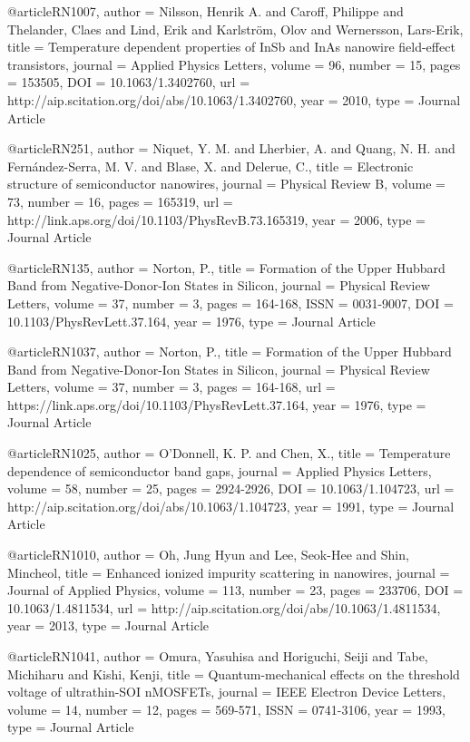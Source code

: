 @article{RN1007,
   author = {Nilsson, Henrik A. and Caroff, Philippe and Thelander, Claes and Lind, Erik and Karlström, Olov and Wernersson, Lars-Erik},
   title = {Temperature dependent properties of InSb and InAs nanowire field-effect transistors},
   journal = {Applied Physics Letters},
   volume = {96},
   number = {15},
   pages = {153505},
   DOI = {10.1063/1.3402760},
   url = {http://aip.scitation.org/doi/abs/10.1063/1.3402760},
   year = {2010},
   type = {Journal Article}
}

@article{RN251,
   author = {Niquet, Y. M. and Lherbier, A. and Quang, N. H. and Fernández-Serra, M. V. and Blase, X. and Delerue, C.},
   title = {Electronic structure of semiconductor nanowires},
   journal = {Physical Review B},
   volume = {73},
   number = {16},
   pages = {165319},
   url = {http://link.aps.org/doi/10.1103/PhysRevB.73.165319},
   year = {2006},
   type = {Journal Article}
}

@article{RN135,
   author = {Norton, P.},
   title = {Formation of the Upper Hubbard Band from Negative-Donor-Ion States in Silicon},
   journal = {Physical Review Letters},
   volume = {37},
   number = {3},
   pages = {164-168},
   ISSN = {0031-9007},
   DOI = {10.1103/PhysRevLett.37.164},
   year = {1976},
   type = {Journal Article}
}

@article{RN1037,
   author = {Norton, P.},
   title = {Formation of the Upper Hubbard Band from Negative-Donor-Ion States in Silicon},
   journal = {Physical Review Letters},
   volume = {37},
   number = {3},
   pages = {164-168},
   url = {https://link.aps.org/doi/10.1103/PhysRevLett.37.164},
   year = {1976},
   type = {Journal Article}
}

@article{RN1025,
   author = {O’Donnell, K. P. and Chen, X.},
   title = {Temperature dependence of semiconductor band gaps},
   journal = {Applied Physics Letters},
   volume = {58},
   number = {25},
   pages = {2924-2926},
   DOI = {10.1063/1.104723},
   url = {http://aip.scitation.org/doi/abs/10.1063/1.104723},
   year = {1991},
   type = {Journal Article}
}

@article{RN1010,
   author = {Oh, Jung Hyun and Lee, Seok-Hee and Shin, Mincheol},
   title = {Enhanced ionized impurity scattering in nanowires},
   journal = {Journal of Applied Physics},
   volume = {113},
   number = {23},
   pages = {233706},
   DOI = {10.1063/1.4811534},
   url = {http://aip.scitation.org/doi/abs/10.1063/1.4811534},
   year = {2013},
   type = {Journal Article}
}

@article{RN1041,
   author = {Omura, Yasuhisa and Horiguchi, Seiji and Tabe, Michiharu and Kishi, Kenji},
   title = {Quantum-mechanical effects on the threshold voltage of ultrathin-SOI nMOSFETs},
   journal = {IEEE Electron Device Letters},
   volume = {14},
   number = {12},
   pages = {569-571},
   ISSN = {0741-3106},
   year = {1993},
   type = {Journal Article}
}

